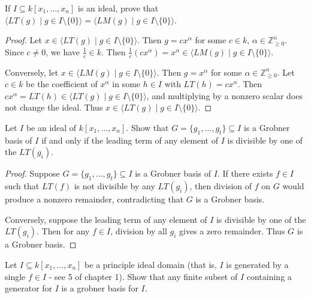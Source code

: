 \begin{tcolorbox}[title=Problem 4, breakable]
    If $I \subseteq k[x_1, \ldots, x_n]$ is an ideal,
    prove that $\langle LT(g) \mid g \in I \setminus \{0\} \rangle = \langle LM(g) \mid g \in I \setminus \{0\} \rangle$.
\end{tcolorbox}

\begin{proof}
    Let $x \in \langle LT(g) \mid g \in I \setminus \{0\} \rangle$.
    Then $g = c x^\alpha$ for some $c \in k$, $\alpha \in \mathbb{Z}_{\ge 0}^n$.
    Since $c \ne 0$, we have $\frac{1}{c} \in k$.
    Then $\frac{1}{c} (c x^\alpha) = x^\alpha \in \langle LM(g) \mid g \in I \setminus \{0\} \rangle$.

    Conversely, let $x \in \langle LM(g) \mid g \in I \setminus \{0\} \rangle$.
    Then $g = x^\alpha$ for some $\alpha \in \mathbb{Z}_{\ge 0}^n$.
    Let $c \in k$ be the coefficient of $x^\alpha$ in some $h \in I$ with $LT(h) = c x^\alpha$.
    Then $c x^\alpha = LT(h) \in \langle LT(g) \mid g \in I \setminus \{0\} \rangle$,
        and multiplying by a nonzero scalar does not change the ideal.
    Thus $x \in \langle LT(g) \mid g \in I \setminus \{0\} \rangle$.
\end{proof}

\begin{tcolorbox}[title=Problem 5, breakable]
    Let $I$ be an ideal of $k[x_1, \ldots, x_n]$.
    Show that $G = \{g_1, \ldots, g_t\} \subseteq I$
    is a Grobner basis of $I$ if and only if
    the leading term of any element of $I$ is divisible 
    by one of the $LT(g_i)$.
\end{tcolorbox}

\begin{proof}
    Suppose $G = \{g_1, \ldots, g_t\} \subseteq I$ is a Grobner basis of $I$.
    If there exists $f \in I$ such that $LT(f)$ is not divisible by any $LT(g_i)$, 
    then division of $f$ on $G$ would produce a nonzero remainder, 
    contradicting that $G$ is a Grobner basis.

    Conversely, suppose the leading term of any element of $I$ is divisible 
        by one of the $LT(g_i)$. 
    Then for any $f \in I$, division by all $g_i$ gives a zero remainder.
    Thus $G$ is a Grobner basis.
\end{proof}

\begin{tcolorbox}[title=Problem 10, breakable]
    Let $I \subseteq k[x_1, \ldots, x_n]$ be a principle 
    ideal domain (that is, $I$ is generated by a single $f \in I$ -
    see 5 of chapter 1). Show that any finite subset of $I$ 
    containing a generator for $I$ is a grobner basis for $I$.
\end{tcolorbox}

